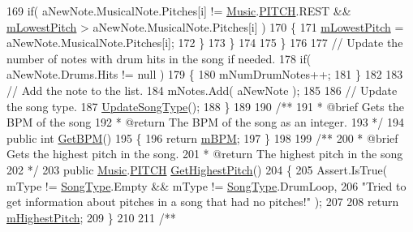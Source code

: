 \begin{DoxyCodeInclude}
169                 \textcolor{keywordflow}{if}( aNewNote.MusicalNote.Pitches[i] != \hyperlink{class_music}{Music}.\hyperlink{group___music_enums_ga508f69b199ea518f935486c990edac1d}{PITCH}.REST && 
      \hyperlink{group___song_priv_var_ga293976ef4c2050687a81edfbf77b4fc1}{mLowestPitch} > aNewNote.MusicalNote.Pitches[i] )
170                 \{
171                     \hyperlink{group___song_priv_var_ga293976ef4c2050687a81edfbf77b4fc1}{mLowestPitch} = aNewNote.MusicalNote.Pitches[i];
172                 \}
173             \}
174 
175         \}
176 
177         \textcolor{comment}{// Update the number of notes with drum hits in the song if needed.}
178         \textcolor{keywordflow}{if}( aNewNote.Drums.Hits != null )
179         \{
180             mNumDrumNotes++;
181         \}
182 
183         \textcolor{comment}{// Add the note to the list.}
184         mNotes.Add( aNewNote );
185 
186         \textcolor{comment}{// Update the song type.}
187         \hyperlink{group___song_priv_func_ga9a1d6eba1576c3631d3c0331196d9ae2}{UpdateSongType}();
188     \}
189 \textcolor{comment}{}
190 \textcolor{comment}{    /**}
191 \textcolor{comment}{     * @brief Gets the BPM of the song}
192 \textcolor{comment}{     * @return The BPM of the song as an integer.}
193 \textcolor{comment}{    */}
194     \textcolor{keyword}{public} \textcolor{keywordtype}{int} \hyperlink{group___song_pub_func_gaaaf3d27d474713d7d368e3fd4c570be0}{GetBPM}()
195     \{
196         \textcolor{keywordflow}{return} \hyperlink{group___song_priv_var_ga3341fbbd9c0c58fe6514623e6b6c5a1e}{mBPM};
197     \}
198 \textcolor{comment}{}
199 \textcolor{comment}{    /** }
200 \textcolor{comment}{     * @brief Gets the highest pitch in the song.}
201 \textcolor{comment}{     * @return The highest pitch in the song}
202 \textcolor{comment}{    */}
203     \textcolor{keyword}{public} \hyperlink{class_music}{Music}.\hyperlink{group___music_enums_ga508f69b199ea518f935486c990edac1d}{PITCH} \hyperlink{group___song_pub_func_gafaa104e8653edf64148260ecd400570f}{GetHighestPitch}()
204     \{
205         Assert.IsTrue( mType != \hyperlink{group___song_enums_gae681a1f001333e39fc1cb4fea97bfe1b}{SongType}.Empty && mType != \hyperlink{group___song_enums_gae681a1f001333e39fc1cb4fea97bfe1b}{SongType}.DrumLoop,
206             \textcolor{stringliteral}{"Tried to get information about pitches in a song that had no pitches!"} );
207 
208         \textcolor{keywordflow}{return} \hyperlink{group___song_priv_var_ga2dcd39d9add609e9df56a94057441dcc}{mHighestPitch};
209     \}
210 \textcolor{comment}{}
211 \textcolor{comment}{    /** }

\end{DoxyCodeInclude}
